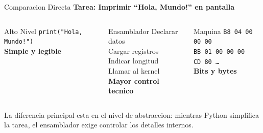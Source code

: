 \documentclass[10pt, aspectratio=169]{beamer}
\begin{document}
	\begin{frame}{Comparacion Directa}
		\centering
		\textbf{Tarea: Imprimir ``Hola, Mundo!'' en pantalla}
		
		\vspace{0.4cm}
		\begin{columns}
			\begin{block}{\centering Alto Nivel}
				\centering
				\vspace{0.15cm}
				\texttt{\small print("Hola, Mundo!")} \\[0.2cm]
				\textbf{Simple y legible}
				\vspace{0.1cm}
			\end{block}
			
			\begin{block}{\centering Ensamblador}
				\centering
				\vspace{0.1cm}
				\small
				Declarar datos \\
				Cargar registros \\
				Indicar longitud \\
				Llamar al kernel \\[0.1cm]
				\textbf{Mayor control tecnico}
				\vspace{0.1cm}
			\end{block}
			
			\begin{block}{\centering Maquina}
				\centering
				\vspace{0.1cm}
				\small
				\texttt{B8 04 00 00 00} \\
				\texttt{BB 01 00 00 00} \\
				\texttt{CD 80 \ldots} \\[0.1cm]
				\textbf{Bits y bytes}
				\vspace{0.1cm}
			\end{block}
		\end{columns}
		
		\vspace{0.35cm}
		\small La diferencia principal esta en el nivel de abstraccion: mientras Python
		simplifica la tarea, el ensamblador exige controlar los detalles internos.
	\end{frame}
	
\end{document}
